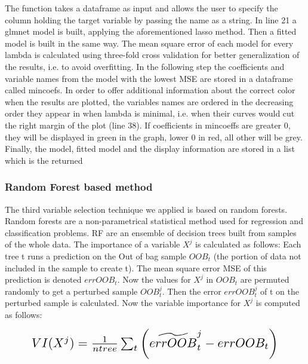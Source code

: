 \documentclass[11pt]{article}
\begin{document}
The function takes a dataframe as input and allows the user to specify the column holding the target variable by passing the name as a string.
In line 21 a glmnet model is built, applying the aforementioned lasso method.
Then a fitted model is built in the same way. The mean square error of each model for every lambda is calculated using three-fold cross validation for better generalization of the results, i.e. to avoid overfitting.
In the following step the coefficients and variable names from the model with the lowest MSE are stored in a dataframe called mincoefs. In order to offer additional information about the correct color when the results are plotted, the variables names are ordered in the decreasing order they appear in when lambda is minimal, i.e. when their curves would cut the right margin of the plot (line 38). If coefficients in mincoeffs are greater 0, they will be displayed in green in the graph, lower 0 in red, all other will be grey.
Finally, the model, fitted model and the display information are stored in a list which is the returned



\subsubsection{Random Forest based method}

The third variable selection technique we applied is based on random forests.
Random forests are a non-parametrical statistical method used for regression and classification problems. RF are an ensemble of decision trees built from samples of the whole data. The importance of a variable $X^j$ is calculated as follows: Each tree t runs a prediction on the Out of bag sample $OOB_{t}$ (the portion of data not included in the sample to create t). The mean square error MSE of this prediction is denoted $errOOB_{t}$. Now the values for $X^j$ in $OOB_{t}$ are permuted randomly to get a perturbed sample ${OOB}^j_{t}$. Then the error ${errOOB}^j_{t}$ of t on the perturbed sample is calculated. Now the variable importance for $X^j$ is computed as follows:
\begin{center}  \[ \scalebox{1.5} {$VI(X^j)=\frac{1}{ntree}\sum_{t}\left ( \widetilde{errOOB}^j_{t} - errOOB_{t} \right )$}\] \end{center}
\end{document}
